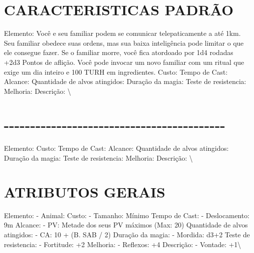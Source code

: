\documentclass{article}%
\begin{document}
\section{CARACTERISTICAS PADRÃO}%
\label{sec:CARACTERISTICASPADRO}%
Elemento: Você e seu familiar podem se comunicar telepaticamente a até 1km. Seu familiar obedece suas ordens, mas sua baixa inteligência pode limitar o que ele consegue fazer. Se o familiar morre, você fica atordoado por 1d4 rodadas +2d3 Pontos de aflição. Você pode invocar um novo familiar com um ritual que exige um dia inteiro e 100 TURH em ingredientes.\newline%
Custo: \newline%
Tempo de Cast: \newline%
Alcance: \newline%
Quantidade de alvos atingidos: \newline%
Duração da magia: \newline%
Teste de resistencia: \newline%
Melhoria: \newline%
Descrição: \textbackslash{}

%
\section{{-}{-}{-}{-}{-}{-}{-}{-}{-}{-}{-}{-}{-}{-}{-}{-}{-}{-}{-}{-}{-}{-}{-}{-}{-}{-}{-}{-}{-}{-}{-}{-}{-}{-}{-}{-}{-}{-}{-}{-}{-}{-}}%
\label{sec:{-}{-}{-}{-}{-}{-}{-}{-}{-}{-}{-}{-}{-}{-}{-}{-}{-}{-}{-}{-}{-}{-}{-}{-}{-}{-}{-}{-}{-}{-}{-}{-}{-}{-}{-}{-}{-}{-}{-}{-}{-}{-}}%
Elemento: \newline%
Custo: \newline%
Tempo de Cast: \newline%
Alcance: \newline%
Quantidade de alvos atingidos: \newline%
Duração da magia: \newline%
Teste de resistencia: \newline%
Melhoria: \newline%
Descrição: \textbackslash{}

%
\section{ATRIBUTOS GERAIS}%
\label{sec:ATRIBUTOSGERAIS}%
Elemento: {-} Animal:\newline%
Custo: {-} Tamanho: Mínimo\newline%
Tempo de Cast: {-} Deslocamento: 9m\newline%
Alcance: {-} PV: Metade dos seus PV máximos (Max: 20)\newline%
Quantidade de alvos atingidos: {-} CA: 10 + (B. SAB / 2)\newline%
Duração da magia: {-} Mordida: d3+2\newline%
Teste de resistencia: {-} Fortitude: +2\newline%
Melhoria: {-} Reflexos: +4\newline%
Descrição: {-} Vontade: +1\textbackslash{}
\end{document}
